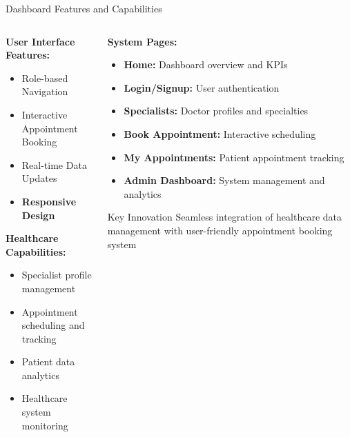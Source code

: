 \documentclass[aspectratio=169]{beamer}
\begin{document}
\begin{frame}{Dashboard Features and Capabilities}
\begin{columns}
\begin{column}{0.5\textwidth}
\textbf{User Interface Features:}
\begin{itemize}
    \item \textcolor{medicalblue}{Role-based Navigation}
    \item \textcolor{medicalgreen}{Interactive Appointment Booking}
    \item \textcolor{myred}{Real-time Data Updates}
    \item \textbf{Responsive Design}
\end{itemize}

\vspace{0.5cm}

\textbf{Healthcare Capabilities:}
\begin{itemize}
    \item Specialist profile management
    \item Appointment scheduling and tracking
    \item Patient data analytics
    \item Healthcare system monitoring
\end{itemize}
\end{column}
\begin{column}{0.5\textwidth}
\textbf{System Pages:}
\begin{itemize}
    \item \textbf{Home:} Dashboard overview and KPIs
    \item \textbf{Login/Signup:} User authentication
    \item \textbf{Specialists:} Doctor profiles and specialties
    \item \textbf{Book Appointment:} Interactive scheduling
    \item \textbf{My Appointments:} Patient appointment tracking
    \item \textbf{Admin Dashboard:} System management and analytics
\end{itemize}

\vspace{0.5cm}
\begin{alertblock}{Key Innovation}
Seamless integration of healthcare data management with user-friendly appointment booking system
\end{alertblock}
\end{column}
\end{columns}
\end{frame}
\end{document}
